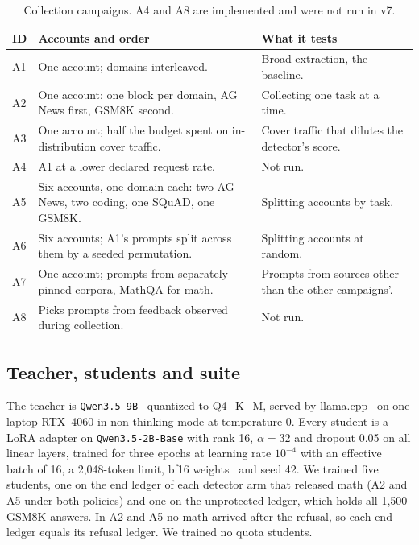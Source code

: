 \documentclass[journal]{IEEEtran}
\begin{document}
\begin{table}[!t]
\centering\footnotesize
\caption{Collection campaigns. A4 and A8 are implemented and were not run in v7.}
\label{tab:campaigns}
\begin{tabularx}{\columnwidth}{@{}lYY@{}}\toprule
ID & Accounts and order & What it tests \\\midrule
A1 & One account; domains interleaved. & Broad extraction, the baseline. \\
A2 & One account; one block per domain, AG News first, GSM8K second. & Collecting one task at a time. \\
A3 & One account; half the budget spent on in-distribution cover traffic. & Cover traffic that dilutes the detector's score. \\
A4 & A1 at a lower declared request rate. & Not run. \\
A5 & Six accounts, one domain each: two AG News, two coding, one SQuAD, one GSM8K. & Splitting accounts by task. \\
A6 & Six accounts; A1's prompts split across them by a seeded permutation. & Splitting accounts at random. \\
A7 & One account; prompts from separately pinned corpora, MathQA for math. & Prompts from sources other than the other campaigns'. \\
A8 & Picks prompts from feedback observed during collection. & Not run. \\\bottomrule
\end{tabularx}
\end{table}

\subsection{Teacher, students and suite}
The teacher is \texttt{Qwen3.5-9B}~\cite{qwen2026qwen35} quantized to Q4\_K\_M, served by llama.cpp~\cite{llamacpp} on one laptop RTX~4060 in non-thinking mode at temperature 0. Every student is a LoRA adapter on \texttt{Qwen3.5-2B-Base} with rank 16, $\alpha=32$ and dropout 0.05 on all linear layers, trained for three epochs at learning rate $10^{-4}$ with an effective batch of 16, a 2,048-token limit, bf16 weights~\cite{hu2022lora,loshchilov2019adamw} and seed 42. We trained five students, one on the end ledger of each detector arm that released math (A2 and A5 under both policies) and one on the unprotected ledger, which holds all 1,500 GSM8K answers. In A2 and A5 no math arrived after the refusal, so each end ledger equals its refusal ledger. We trained no quota students.
\end{document}
